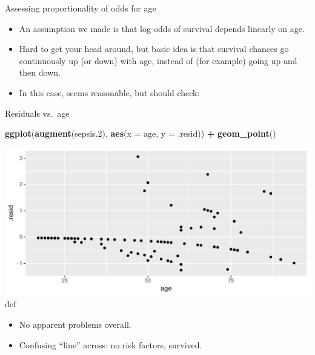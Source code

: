 \documentclass[ignorenonframetext,]{beamer}
\newenvironment{Shaded}{\begin{snugshade}}{\end{snugshade}}
\newcommand{\DataTypeTok}[1]{\textcolor[rgb]{0.13,0.29,0.53}{#1}}
\newcommand{\FloatTok}[1]{\textcolor[rgb]{0.00,0.00,0.81}{#1}}
\newcommand{\KeywordTok}[1]{\textcolor[rgb]{0.13,0.29,0.53}{\textbf{#1}}}
\newcommand{\NormalTok}[1]{#1}
\newcommand{\OperatorTok}[1]{\textcolor[rgb]{0.81,0.36,0.00}{\textbf{#1}}}
\newcommand{\StringTok}[1]{\textcolor[rgb]{0.31,0.60,0.02}{#1}}
\begin{document}
\begin{frame}{Assessing proportionality of odds for age}
\protect\hypertarget{assessing-proportionality-of-odds-for-age}{}

\begin{itemize}
\item
  An assumption we made is that log-odds of survival depends linearly on
  age.
\item
  Hard to get your head around, but basic idea is that survival chances
  go continuously up (or down) with age, instead of (for example) going
  up and then down.
\item
  In this case, seems reasonable, but should check:
\end{itemize}

\end{frame}

\begin{frame}[fragile]{Residuals vs.~age}
\protect\hypertarget{residuals-vs.age}{}

\begin{Shaded}
\begin{Highlighting}[]
\KeywordTok{ggplot}\NormalTok{(}\KeywordTok{augment}\NormalTok{(sepsis}\FloatTok{.2}\NormalTok{), }\KeywordTok{aes}\NormalTok{(}\DataTypeTok{x =}\NormalTok{ age, }\DataTypeTok{y =}\NormalTok{ .resid)) }\OperatorTok{+}
\StringTok{  }\KeywordTok{geom_point}\NormalTok{()}
\end{Highlighting}
\end{Shaded}

\includegraphics{figure/virtusentella-1.pdf} def

\begin{itemize}
\item
  No apparent problems overall.
\item
  Confusing ``line'' across: no risk factors, survived.
\end{itemize}

\end{frame}
\end{document}
